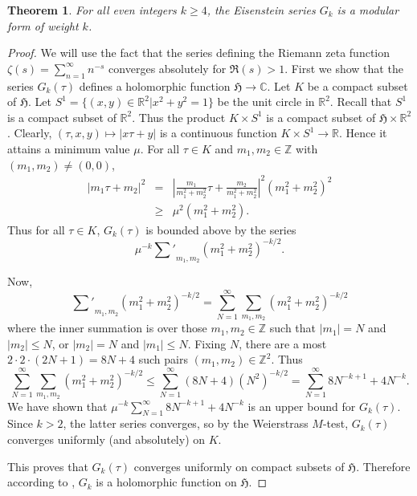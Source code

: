 \documentclass{article}
\newtheorem{theorem}{Theorem}
\begin{document}
\begin{theorem}
For all even integers $k \geq 4$, the Eisenstein series $G_k$ is a modular form of weight $k$.
\end{theorem}
\begin{proof}
We will use the fact \cite[Chapter V, \S 1]{MR1659317} that the series defining the Riemann zeta function
$\zeta(s)=\sum_{n=1}^\infty n^{-s}$ converges absolutely for $\Re(s)>1$.
First we show that the series $G_k(\tau)$ defines a holomorphic function $\mathfrak{H} \to \mathbb{C}$.
Let $K$ be a compact subset of $\mathfrak{H}$. Let $S^1=\{(x,y) \in \mathbb{R}^2 | x^2+y^2=1\}$ be the unit circle
in $\mathbb{R}^2$. Recall that $S^1$ is a compact subset of $\mathbb{R}^2$.
Thus the product $K \times S^1$ is a compact subset of $\mathfrak{H} \times \mathbb{R}^2$.
Clearly, $(\tau,x,y) \mapsto |x\tau+y|$ is a continuous function $K \times S^1 \to \mathbb{R}$. Hence
it attains a minimum value $\mu$.
For all $\tau \in K$ and $m_1,m_2 \in \mathbb{Z}$ with $(m_1,m_2)\neq (0,0)$,
\begin{eqnarray*}
|m_1\tau+m_2|^2&=&|\frac{m_1}{m_1^2+m_2^2}\tau+\frac{m_2}{m_1^2+m_2^2}|^2(m_1^2+m_2^2)^2\\
&\geq&\mu^2(m_1^2+m_2^2).
\end{eqnarray*}
Thus for all $\tau \in K$,
$G_k(\tau)$ is bounded above by the series
\[
\mu^{-k} {{\sum}'}_{m_1,m_2} (m_1^2+m_2^2)^{-k/2}.
\]

Now,
\[
{{\sum}'}_{m_1,m_2}(m_1^2+m_2^2)^{-k/2} = \sum_{N=1}^\infty \sum_{m_1,m_2} (m_1^2+m_2^2)^{-k/2}
\]
where the inner summation is over those $m_1,m_2 \in \mathbb{Z}$ such that
$|m_1|=N$ and $|m_2| \leq N$, or $|m_2|=N$ and $|m_1| \leq N$.
Fixing $N$, there are a most $2\cdot 2\cdot (2N+1)=8N+4$ such
pairs $(m_1,m_2) \in \mathbb{Z}^2$. Thus
\[
\sum_{N=1}^\infty \sum_{m_1,m_2} (m_1^2+m_2^2)^{-k/2} \leq \sum_{N=1}^\infty (8N+4)(N^2)^{-k/2}=\sum_{N=1}^\infty 8N^{-k+1}+4N^{-k}.
\]
We have shown that $\mu^{-k} \sum_{N=1}^\infty 8N^{-k+1}+4N^{-k}$ is an upper bound for $G_k(\tau)$.
Since $k>2$, the latter series converges, so by the 
Weierstrass $M$-test, 
$G_k(\tau)$ converges uniformly (and absolutely) on $K$.

This proves that $G_k(\tau)$ converges uniformly on compact subsets of $\mathfrak{H}$.
Therefore according to \cite[Theorem 1.1, Chapter V]{MR1659317},
$G_k$ is a holomorphic function on $\mathfrak{H}$.


\end{proof}
\end{document}
